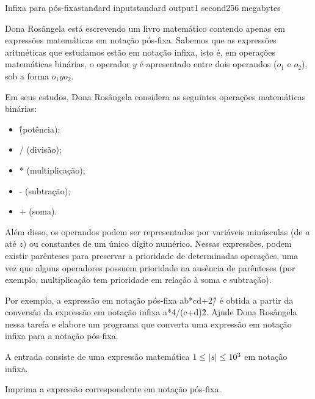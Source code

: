 \begin{problem}{Infixa para pós-fixa}{standard input}{standard output}{1 second}{256 megabytes}

Dona Rosângela está escrevendo um livro matemático contendo apenas em expressões matemáticas em notação pós-fixa. Sabemos que as expressões aritméticas que estudamos estão em notação infixa, isto é, em operações matemáticas binárias, o operador $y$ é apresentado entre dois operandos ($o_1$ e $o_2$), sob a forma $o_1 y o_2$.

Em seus estudos, Dona Rosângela considera as seguintes operações matemáticas binárias:

\begin{itemize}
\item \^ (potência);
\item / (divisão);
\item * (multiplicação);
\item - (subtração);
\item + (soma).
\end{itemize}

Além disso, os operandos podem ser representados por variáveis minúsculas (de $a$ até $z$) ou constantes de um único dígito numérico. Nessas expressões, podem existir parênteses para preservar a prioridade de determinadas operações, uma vez que alguns operadores possuem prioridade na ausência de parênteses (por exemplo, multiplicação tem prioridade em relação à soma e subtração).

Por exemplo, a expressão em notação pós-fixa ab*cd+2\^/ é obtida a partir da conversão da expressão em notação infixa a*4/(c+d)\^2. Ajude Dona Rosângela nessa tarefa e elabore um programa que converta uma expressão em notação infixa para a notação pós-fixa.


\InputFile
A entrada consiste de uma expressão matemática $1 \leq \arrowvert s \arrowvert \leq 10^3$ em notação infixa.

\OutputFile
Imprima a expressão correspondente em notação pós-fixa.

\Examples

\begin{example}
%
%
%
\end{example}

\end{problem}

